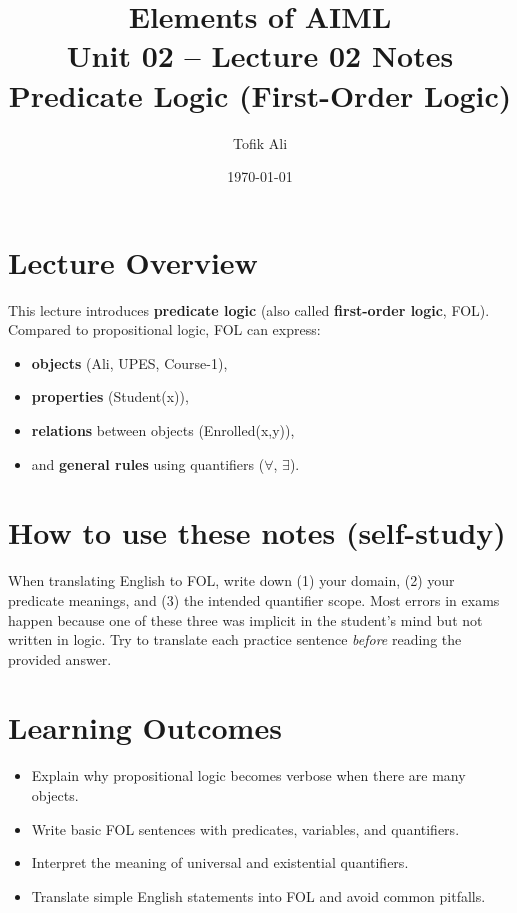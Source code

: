 \documentclass[11pt]{article}
\title{Elements of AIML\\Unit 02 -- Lecture 02 Notes\\Predicate Logic (First-Order Logic)}
\author{Tofik Ali}
\date{\today}
\begin{document}
\maketitle
\tableofcontents

\section{Lecture Overview}
This lecture introduces \textbf{predicate logic} (also called \textbf{first-order logic}, FOL). Compared to propositional logic, FOL can express:
\begin{itemize}[leftmargin=*]
  \item \textbf{objects} (Ali, UPES, Course-1),
  \item \textbf{properties} (Student(x)),
  \item \textbf{relations} between objects (Enrolled(x,y)),
  \item and \textbf{general rules} using quantifiers ($\forall$, $\exists$).
\end{itemize}
\notesources{\AIMLUnitIISources}

\section{How to use these notes (self-study)}
When translating English to FOL, write down (1) your domain, (2) your predicate meanings, and (3) the intended quantifier scope.
Most errors in exams happen because one of these three was implicit in the student's mind but not written in logic.
Try to translate each practice sentence \emph{before} reading the provided answer.

\section{Learning Outcomes}
\begin{itemize}[leftmargin=*]
  \item Explain why propositional logic becomes verbose when there are many objects.
  \item Write basic FOL sentences with predicates, variables, and quantifiers.
  \item Interpret the meaning of universal and existential quantifiers.
  \item Translate simple English statements into FOL and avoid common pitfalls.
\end{itemize}
\end{document}

